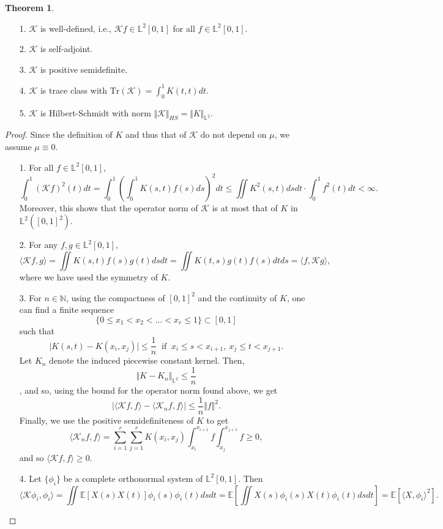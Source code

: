 \documentclass[10pt, a4paper]{report}
\newcommand{\E}[0]{\mathbb{E}}
\newcommand{\N}[0]{\mathbb{N}}
\newcommand{\Ll}[0]{\mathbb{L}}
\newcommand{\K}[0]{\mathcal{K}}
\theoremstyle{definition}
\newtheorem{theorem}{Theorem}
\theoremstyle{remark}
\begin{document}
\begin{theorem}\label{propcovop}
	\begin{itemize}
		\item[]
		\item[1.] $\K$ is well-defined, i.e., $\K f \in \Ll^2[0,1]$ for all $f\in \Ll^2[0,1]$.
		\item[2.] $\K$ is self-adjoint.
		\item[3.] $\K$ is positive semidefinite.
		\item[4.] $\K$ is trace class with $\mathrm{Tr}(\K)=\int_{0}^{1}K(t,t)dt$.
		\item[5.] $\K$ is Hilbert-Schmidt with norm $\Vert \K \Vert_{HS} = \Vert K \Vert_{\Ll^2}$.
	\end{itemize}
	\begin{proof}
		Since the definition of $K$ and thus that of $\K$ do not depend on $\mu$, we assume $\mu \equiv 0$.
		\begin{itemize}
			\item[1.] For all $f \in \Ll^2[0,1]$, 
			$$\int_{0}^{1}(\K f)^2(t)dt = \int_{0}^{1}\left(\int_{0}^{1}K(s,t)f(s)ds\right)^2dt \leq \iint K^2(s,t)dsdt \cdot \int_{0}^1 f^2(t)dt < \infty.$$
			Moreover, this shows that the operator norm of $\K$ is at most that of $K$ in $\Ll^2([0,1]^2)$.
			\item[2.] For any $f,g \in \Ll^2[0,1]$, 
			$$\langle \K f,g \rangle = \iint K(s,t)f(s)g(t)dsdt = \iint K(t,s)g(t)f(s)dtds = \langle f,\K g \rangle,$$
			where we have used the symmetry of $K$.
			\item[3.] For $n\in \N$, using the compactness of $[0,1]^2$ and the continuity of $K$, one can find a finite sequence 
			$$\{0\leq x_1 <  x_2< ...< x_r \leq 1\} \subset [0,1]$$
			such that 
			$$\vert K(s,t) - K(x_i,x_j)\vert \leq \frac{1}{n} \ \text{ if } \ x_i\leq s<x_{i+1}, \ x_j\leq t<x_{j+1}.$$
			Let $K_n$ denote the induced piecewise constant kernel. Then, $$\Vert K-K_n \Vert_{\Ll^2}\leq \frac{1}{n}$$, and so, using the bound for the operator norm found above, we get 
			$$\vert \langle \K f,f \rangle - \langle \K_n f,f \rangle\vert \leq \frac{1}{n}\Vert f\Vert^2.$$
			Finally, we use the positive semidefiniteness of $K$ to get
			$$\langle \K_n f,f \rangle = \sum_{i=1}^{r}\sum_{j=1}^{r} K(x_i,x_j) \int_{x_i}^{x_{i+1}}\! f \int_{x_j}^{x_{j+1}}\!f \geq 0,$$
			and so $\langle \K f,f \rangle\geq 0$.
			\item[4.] Let $\{\phi_i\}$ be a complete orthonormal system of $\Ll^2[0,1]$. Then
			$$\langle \K \phi_i,\phi_i \rangle = \iint \E[X(s)X(t)]\phi_i(s)\phi_i(t)dsdt = \E\left[\iint X(s)\phi_i(s)X(t)\phi_i(t)dsdt\right] = \E[\langle X,\phi_i\rangle^2].$$

\end{itemize}
\end{proof}
\end{theorem}
\end{document}
